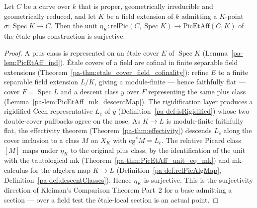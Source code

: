 \begin{theorem}
  \label{pa-thm:unit_surjective_of_section}
  \leanok

  Let \(C\) be a curve over \(k\) that is proper, geometrically irreducible and geometrically
  reduced, and let \(K\) be a field extension of \(k\) admitting a \(K\)-point \(\sigma \colon
  \operatorname{Spec} K \to C\). Then the unit \(\eta_K \colon \mathrm{relPic}(C, \operatorname{Spec}
  K) \to \mathrm{PicEtAff}(C, K)\) of the \'etale plus construction is surjective.
\end{theorem}
\begin{proof}
  \leanok
  A plus class is represented on an \'etale cover \(E\) of \(\operatorname{Spec} K\)
  (Lemma~\ref{pa-lem:PicEtAff_ind}). \'Etale covers of a field are cofinal in finite separable field
  extensions (Theorem~\ref{pa-thm:etale_cover_field_cofinality}): refine \(E\) to a finite separable
  field extension \(L/K\), giving a module-finite --- hence faithfully flat --- cover \(F =
  \operatorname{Spec} L\) and a descent class \(y\) over \(F\) representing the same plus class
  (Lemma~\ref{pa-lem:PicEtAff_mk_descentMap}). The rigidification layer produces a rigidified \v Cech
  representative \(L_c\) of \(y\) (Definition~\ref{pa-def:isRigidified}) whose two double-cover pullbacks
  agree on the nose. As \(K \to L\) is module-finite faithfully flat, the effectivity theorem
  (Theorem~\ref{pa-thm:effectivity}) descends \(L_c\) along the cover inclusion to a class \(M\) on
  \(X_K\) with \(\mathrm{cg}^{*}M = L_c\). The relative Picard class \([M]\) maps under \(\eta_K\) to
  the original plus class, by the identification of the unit with the tautological \(\mathrm{mk}\)
  (Theorem~\ref{pa-thm:PicEtAff_unit_eq_mk}) and \(\mathrm{mk}\)-calculus for the algebra map \(K \to L\)
  (Definition~\ref{pa-def:relPicAlgMap}, Definition~\ref{pa-def:descentClasses}). Hence \(\eta_K\) is
  surjective. This is the surjectivity direction of Kleiman's Comparison Theorem Part~2 for a base
  admitting a section --- over a field test the \'etale-local section is an actual point.
\end{proof}


